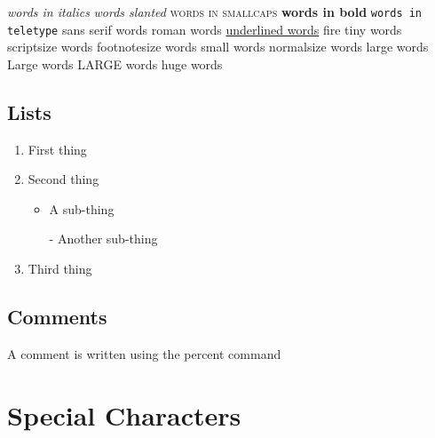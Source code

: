 \documentclass[a4paper,12pt]{report}
\begin{document}
\textit{words in italics} \newline
\textsl{words slanted} \newline
\textsc{words in smallcaps} \newline
\textbf{words in bold} \newline
\texttt{words in teletype} \newline
\textsf{sans serif words} \newline
\textrm{roman words} \newline
\underline{underlined words} \newline
{\color{red}fire} \newline
{\tiny tiny words} \newline
{\scriptsize scriptsize words} \newline
{\footnotesize footnotesize words} \newline
{\small small words} \newline
{\normalsize normalsize words} \newline
{\large large words} \newline
{\Large Large words} \newline
{\LARGE LARGE words} \newline
{\huge huge words} \newline

\subsection{Lists}
\begin{enumerate}
\item First thing
\item Second thing
\begin{itemize}
\item A sub-thing
\item[-] Another sub-thing
\end{itemize}
\item Third thing
\end{enumerate}

\subsection{Comments}

\indent A comment is written using the percent command %

\section{Special Characters}
\end{document}
